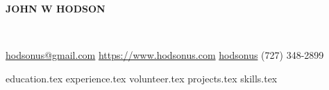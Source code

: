 \documentclass[11pt]{article}
\newcommand*{\sectiondir}{sections/}
\newcommand*{\headerspace}{\vspace{.05cm}}
\begin{document}
	\rfoot{\today}

	\noindent\centerline{ \huge\textbf{JOHN W HODSON} }\\
	\headerspace

	\noindent
	\faEnvelopeSquare \space \href{mailto:hodsonus@gmail.com}{hodsonus@gmail.com} \hspace*{\fill}
	\faHome \space \href{https://www.hodsonus.com}{https://www.hodsonus.com} \hspace*{\fill}
	\faGithub \space \href{https://github.com/hodsonus}{hodsonus} \hspace*{\fill}
	\faMobilePhone \space (727) 348-2899\\
	\headerspace

	{education.tex}
	{experience.tex}
	{volunteer.tex}
	{projects.tex}
	{skills.tex}
\end{document}
